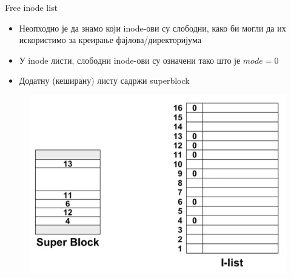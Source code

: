 \documentclass[xcolor=table]{beamer}
\begin{document}
    \begin{frame}[allowframebreaks]{Free inode list}
        \begin{itemize}
            \item Неопходно је да знамо који inode-ови су слободни, како би могли да их искористимо за креирање фајлова/директоријума
            \item У inode листи, слободни inode-ови су означени тако што је \begin{math}mode = 0\end{math}
            \item Додатну (кеширану) листу садржи superblock
        \end{itemize}
        
        \framebreak
        
        \begin{figure}
            \centering
            \includegraphics[width=\textwidth,height=0.8\textheight,keepaspectratio]{images/free_inode_list.png}
            \label{fig:free_inode_list.png}
        \end{figure}
    \end{frame}
    
\end{document}
